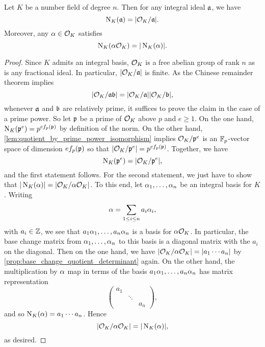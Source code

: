     \begin{proposition}\label{prop:norm_and_field_norms_are_identical}
      Let $K$ be a number field of degree $n$. Then for any integral ideal $\mathfrak{a}$, we have
      \[
        \operatorname{\mathrm{N}}_{K}(\mathfrak{a}) = |\mathcal{O}_{K}/\mathfrak{a}|.
      \]
      Moreover, any $\alpha \in \mathcal{O}_{K}$ satisfies
      \[
        \operatorname{\mathrm{N}}_{K}(\alpha\mathcal{O}_{K}) = |\operatorname{\mathrm{N}}_{K}(\alpha)|.
      \]
    \end{proposition}
    \begin{proof}
      Since $K$ admits an integral basis, $\mathcal{O}_{K}$ is a free abelian group of rank $n$ as is any fractional ideal. In particular, $|\mathcal{O}_{K}/\mathfrak{a}|$ is finite. As the Chinese remainder theorem implies
      \[
        |\mathcal{O}_{K}/\mathfrak{a}\mathfrak{b}| = |\mathcal{O}_{K}/\mathfrak{a}||\mathcal{O}_{K}/\mathfrak{b}|,
      \]
      whenever $\mathfrak{a}$ and $\mathfrak{b}$ are relatively prime, it suffices to prove the claim in the case of a prime power. So let $\mathfrak{p}$ be a prime of $\mathcal{O}_{K}$ above $p$ and $e \ge 1$. On the one hand, $\operatorname{\mathrm{N}}_{K}(\mathfrak{p}^{e}) = p^{ef_{p}(\mathfrak{p})}$ by definition of the norm. On the other hand, \cref{lem:quotient_by_prime_power_isomorphism} implies $\mathcal{O}_{K}/\mathfrak{p}^{e}$ is an $\mathbb{F}_{p}$-vector space of dimension $ef_{p}(\mathfrak{p})$ so that $|\mathcal{O}_{K}/\mathfrak{p}^{e}| = p^{ef_{p}(\mathfrak{p})}$. Together, we have
      \[
        \operatorname{\mathrm{N}}_{K}(\mathfrak{p}^{e}) = |\mathcal{O}_{K}/\mathfrak{p}^{e}|,
      \]
      and the first statement follows. For the second statement, we just have to show that $|\operatorname{\mathrm{N}}_{K}(\alpha)| = |\mathcal{O}_{K}/\alpha\mathcal{O}_{K}|$. To this end, let $\alpha_{1},\ldots,\alpha_{n}$ be an integral basis for $K$. Writing
      \[
        \alpha = \sum_{1 \le i \le n}a_{i}\alpha_{i},
      \]
      with $a_{i} \in \mathbb{Z}$, we see that $a_{1}\alpha_{1},\ldots,a_{n}\alpha_{n}$ is a basis for $\alpha\mathcal{O}_{K}$. In particular, the base change matrix from $\alpha_{1},\ldots,\alpha_{n}$  to this basis is a diagonal matrix with the $a_{i}$ on the diagonal. Then on the one hand, we have $|\mathcal{O}_{K}/\alpha\mathcal{O}_{K}| = |a_{1} \cdots a_{n}|$ by \cref{prop:base_change_quotient_determinant} again. On the other hand, the multiplication by $\alpha$ map in terms of the basis $a_{1}\alpha_{1},\ldots,a_{n}\alpha_{n}$ has matrix representation
      \[
        \begin{pmatrix} a_{1} & & \\ & \ddots & \\ & & a_{n} \end{pmatrix},
      \]
      and so $\operatorname{\mathrm{N}}_{K}(\alpha) = a_{1} \cdots a_{n}$. Hence
      \[
        |\mathcal{O}_{K}/\alpha\mathcal{O}_{K}| = |\operatorname{\mathrm{N}}_{K}(\alpha)|,
      \]
      as desired.
    \end{proof}

